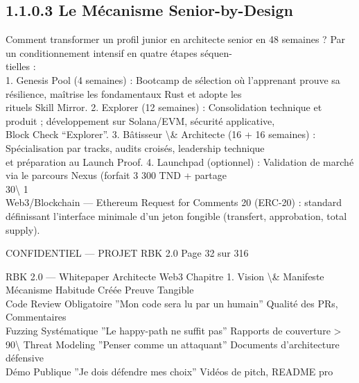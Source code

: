 \subsection{1.1.0.3 Le Mécanisme Senior-by-Design}
\vspace{0.5em}
Comment transformer un profil junior en architecte senior en 48 semaines ? Par un conditionnement intensif en quatre étapes séquen-\\
tielles :\\
1. Genesis Pool (4 semaines) : Bootcamp de sélection où l’apprenant prouve sa résilience, maîtrise les fondamentaux Rust et adopte les\\
rituels Skill Mirror. 2. Explorer (12 semaines) : Consolidation technique et produit ; développement sur Solana/EVM, sécurité applicative,\\
Block Check “Explorer”. 3. Bâtisseur \textbackslash{}& Architecte (16 + 16 semaines) : Spécialisation par tracks, audits croisés, leadership technique\\
et préparation au Launch Proof. 4. Launchpad (optionnel) : Validation de marché via le parcours Nexus (forfait 3 300 TND + partage\\
30\textbackslash{}%
1\\
Web3/Blockchain — Ethereum Request for Comments 20 (ERC-20) : standard définissant l’interface minimale d’un jeton fongible (transfert, approbation, total\\
supply).\\
\vspace{0.5em}
\vspace{0.5em}
\vspace{0.5em}
\begin{confidential}CONFIDENTIEL — PROJET RBK 2.0                                         Page 32 sur 316\end{confidential}
RBK 2.0 — Whitepaper Architecte Web3                                                                           Chapitre 1. Vision \textbackslash{}& Manifeste\\
\vspace{0.5em}
\vspace{0.5em}
\vspace{0.5em}
Mécanisme                 Habitude Créée                     Preuve Tangible\\
Code Review Obligatoire   ”Mon code sera lu par un humain”   Qualité des PRs, Commentaires\\
Fuzzing Systématique      ”Le happy-path ne suffit pas”      Rapports de couverture \textgreater{} 90\textbackslash{}%
Threat Modeling           ”Penser comme un attaquant”        Documents d’architecture défensive\\
Démo Publique             ”Je dois défendre mes choix”       Vidéos de pitch, README pro\\
\vspace{0.5em}
\vspace{0.5em}
\vspace{0.5em}
\vspace{0.5em}
